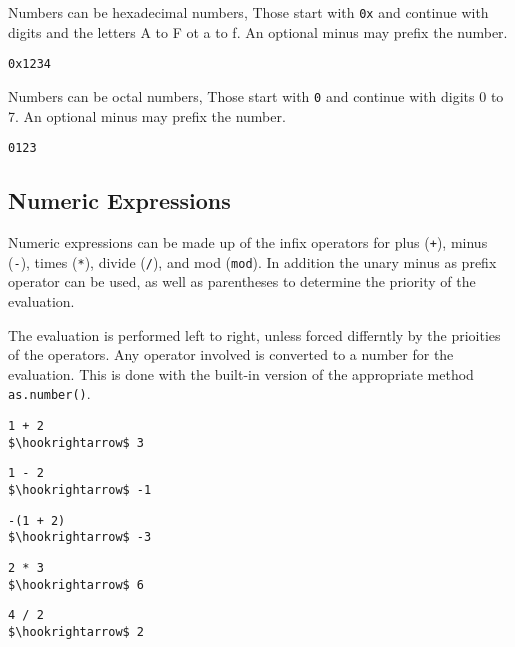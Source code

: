 \documentclass[11pt,a4paper]{scrbook}
\begin{document}
Numbers can be hexadecimal numbers, Those start with \verb|0x| and continue
with digits and the letters A to F ot a to f. An optional minus may prefix the
number.

\begin{lstlisting}[language=BibTool]
0x1234
\end{lstlisting}

Numbers can be octal numbers, Those start with \verb|0| and continue with
digits 0 to 7. An optional minus may prefix the number.

\begin{lstlisting}[language=BibTool]
0123
\end{lstlisting}

\subsection{Numeric Expressions}

Numeric expressions can be made up of the infix operators for plus (\verb|+|),
minus (\verb|-|), times (\verb|*|), divide (\verb|/|), and mod (\verb|mod|).
In addition the unary minus as prefix operator can be used, as well as
parentheses to determine the priority of the evaluation.

The evaluation is performed left to right, unless forced differntly by the
prioities of the operators. Any operator involved is converted to a number for
the evaluation. This is done with the built-in version of the appropriate
method \verb|as.number()|.


\begin{lstlisting}[language=BibTool,mathescape=true]
1 + 2
$\hookrightarrow$ 3
\end{lstlisting}

\begin{lstlisting}[language=BibTool,mathescape=true]
1 - 2
$\hookrightarrow$ -1
\end{lstlisting}

\begin{lstlisting}[language=BibTool,mathescape=true]
-(1 + 2)
$\hookrightarrow$ -3
\end{lstlisting}

\begin{lstlisting}[language=BibTool,mathescape=true]
2 * 3
$\hookrightarrow$ 6
\end{lstlisting}

\begin{lstlisting}[language=BibTool,mathescape=true]
4 / 2
$\hookrightarrow$ 2
\end{lstlisting}
\end{document}

